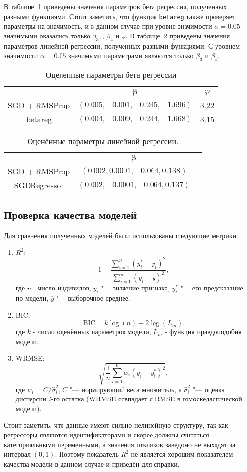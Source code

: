 \documentclass{article}
\begin{document}
В таблице~\ref{tab:beta-params} приведены значения параметров бета регрессии,
полученных разными функциями.
Стоит заметить, что функция \verb|betareg| также проверяет параметры на значимость,
и в данном случае при уровне значимости $\alpha = 0.05$ значимыми оказались только
$\beta_3,$, $\beta_4$ и $\varphi$.
В таблице~\ref{tab:lin-params} приведены значения параметров линейной регрессии,
полученных разными функциями.
С уровнем значимости $\alpha=0.05$ значимыми параметрами являются только
$\beta_3$ и $\beta_4$.
\begin{table}[!ht]
  \centering
  \begin{tabular}{|c|c|c|}
    \hline
    & $\boldsymbol{\beta}$ & $\varphi$ \\ \hline
    SGD + RMSProp & $(0.005, -0.001, -0.245, -1.696)$ & 3.22 \\ \hline
    betareg & $(0.004, -0.009, -0.244, -1.668)$ & 3.15 \\ \hline
  \end{tabular}
  \caption{Оценённые параметры бета регрессии}\label{tab:beta-params}
\end{table}
\begin{table}[!ht]
  \centering
  \begin{tabular}{|c|c|c|}
    \hline
    & $\boldsymbol{\beta}$ \\ \hline
    SGD + RMSProp & $(0.002, 0.0001, -0.064, 0.138)$ \\ \hline
    SGDRegressor & $(0.002, -0.0001, -0.064, 0.137)$ \\ \hline
  \end{tabular}
  \caption{Оценённые параметры линейной регрессии.}\label{tab:lin-params}
\end{table}

\subsection{Проверка качества моделей}
Для сравнения полученных моделей были использованы следующие метрики.
\begin{enumerate}
  \item $R^2$:
    \[
      1 - \frac{\sum_{i=1}^n (y_i^* - y_i)^2}{\sum_{i=1}^{n}(y_i - \overline{y})^2},
    \]
    где $n$ - число индивидов, $y_i$ "--- значение признака,
    $y_i^*$ "--- его предсказание по модели, $\overline{y}$ "--- выборочное среднее.
  \item BIC:
    \[
      \mathrm{BIC} = k \log(n) - 2 \log(L_m).
    \]
    где $k$ - число оценённых параметров модели, $L_m$ - функция правдоподобия модели.
  \item WRMSE:
    \[
      \sqrt{\frac{1}{n}\sum_{i=1}^{n}w_i(y_i - y_i^*)^2},
    \]
    где $w_i = C / \widehat{\sigma}_i^2$, $C$ "--- нормирующий веса множитель,
    а $\widehat{\sigma}_i^2$ "--- оценка дисперсии $i$-го остатка
    (WRMSE совпадает с RMSE в гомоскедастической модели).
\end{enumerate}
Стоит заметить, что данные имеют сильно нелинейную структуру, так как регрессоры
являются идентификаторами и скорее должны считаться категориальными переменными,
а значения откликов заведомо не выходят за интервал $(0, 1)$.
Поэтому показатель $R^2$ не является хорошим показателем качества
модели в данном случае и приведён для справки.
\end{document}
